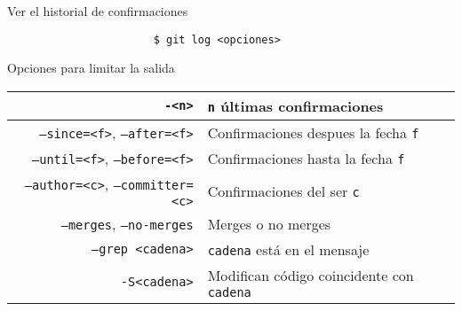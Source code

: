 \begin{frame}[fragile]{Ver el historial de confirmaciones}
  \begin{center}
  \begin{verbatim}
                       $ git log <opciones>
  \end{verbatim}
  \alert{Opciones para limitar la salida}
  \end{center}
  \begin{table}
  \begin{tabular}{|r|p{6cm}|} \hline
    \texttt{-<n>} & \texttt{n} últimas confirmaciones \\ \hline
    \texttt{--since=<f>}, \texttt{--after=<f>} & Confirmaciones despues la fecha \texttt{f}\\ \hline
    \texttt{--until=<f>}, \texttt{--before=<f>} & Confirmaciones hasta la fecha \texttt{f} \\ \hline
    \texttt{--author=<c>}, \texttt{--committer=<c>} & Confirmaciones del ser \texttt{c} \\ \hline
    \texttt{--merges}, \texttt{--no-merges} & Merges o no merges \\ \hline
    \texttt{--grep <cadena>} & \texttt{cadena} está en el mensaje \\ \hline
    \texttt{-S<cadena>} & Modifican código coincidente \newline con \texttt{cadena} \\ \hline
  \end{tabular}
  \end{table}
\end{frame}
